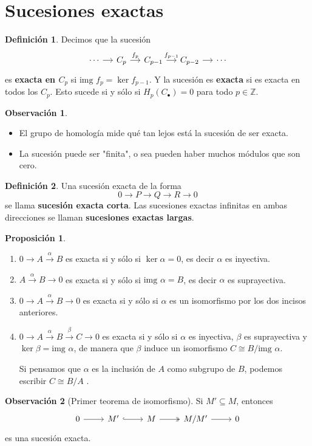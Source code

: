 \documentclass[spanish]{book}
\theoremstyle{definition}
\newtheorem*{defn}{Definición}
\newtheorem*{obs}{Observación}
\newtheorem*{prop}{Proposición}
\begin{document}
	\section{Sucesiones exactas}
	\begin{defn}
		Decimos que la sucesión 
		\[
		\begin{tikzcd}[column sep=small]
			\cdots \arrow{r} & C_p \arrow{r}{f_p} & C_{p-1} \arrow{r}{f_{p-1}} & C_{p-2} \arrow{r} & \cdots
		\end{tikzcd}
		\]
		es \textbf{exacta en $C_p$} si  $\text{img }f_p=\ker{f_{p-1}}$. Y la sucesión es \textbf{exacta} si es exacta en todos los $C_p$. Esto sucede si y sólo si $H_p(C_\bullet{})=0$ para todo $p\in\mathbb{Z}$.
	\end{defn}
	\begin{obs}\leavevmode
		\begin{itemize}
			\item El grupo de homología mide qué tan lejos está la sucesión de ser exacta.
			\item La sucesión puede ser "finita", o sea pueden haber muchos módulos que son cero.
		\end{itemize}
	\end{obs}
	\begin{defn}
		Una sucesión exacta de la forma \[0\to P\to Q\to R\to 0\] se llama \textbf{sucesión exacta corta}. Las sucesiones exactas infinitas en ambas direcciones se llaman \textbf{sucesiones exactas largas}.
	\end{defn}
	\begin{prop}\label{sucex}\leavevmode
		\begin{enumerate}
			\item $0\to A\xrightarrow{\alpha}B$ es exacta si y sólo si $\ker{\alpha}=0$, es decir $\alpha $ es inyectiva.
			\item $A\xrightarrow{\alpha}B\to 0$ es exacta si y sólo si $\text{img }{\alpha}=B$, es decir $\alpha $ es suprayectiva.
			\item $0\to A\xrightarrow{\alpha}B\to 0$ es exacta si y sólo si $\alpha $ es un isomorfismo por los dos incisos anteriores.
			\item $0\to A\xrightarrow{\alpha}B\xrightarrow{\beta} C\to0$ es exacta si y sólo si $\alpha$ es inyectiva, $\beta$ es suprayectiva y $\ker\beta=\text{img }\alpha$, de manera que $\beta$ induce un isomorfismo $C\cong B/\text{img }\alpha$.
			
			Si pensamos que $\alpha$ es la inclusión de $A$ como subgrupo de $B$, podemos escribir $C\cong B/A$ .
		\end{enumerate}
	\end{prop}
	\begin{obs}[Primer teorema de isomorfismo] Si $M'\subseteq M$, entonces
		\[
		\begin{tikzcd}
			0 \arrow{r} & M' \arrow[hookrightarrow]{r} & M \arrow[twoheadrightarrow]{r} & M/M' \arrow{r} & 0
		\end{tikzcd}
		\]
		es una sucesión exacta.
	\end{obs}
\end{document}

